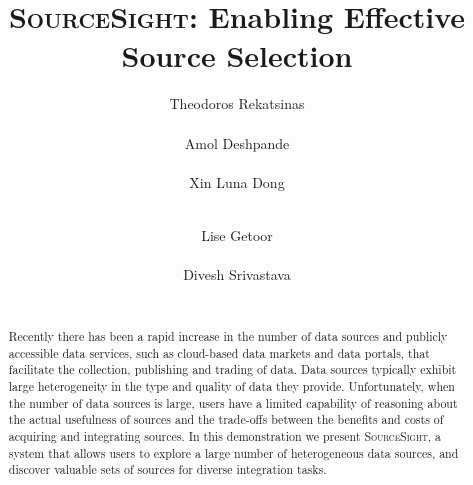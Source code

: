 \documentclass{vldb}
\newcommand\system{\textsc{SourceSight}}
\begin{document}

\title{{\LARGE \system}: Enabling Effective Source Selection}


\author{
\alignauthor
Theodoros Rekatsinas\\
       \\
\alignauthor
Amol Deshpande\\
       \\
\alignauthor 
Xin Luna Dong\\
       \\
\and  %
\alignauthor 
Lise Getoor\\
       \\
\alignauthor Divesh Srivastava\\
       \\
}

\maketitle

\begin{abstract}
Recently there has been a rapid increase in the number of data sources and publicly accessible data services, such as cloud-based data markets and data portals, that facilitate the collection, publishing and trading of data. Data sources typically exhibit large heterogeneity in the type and quality of data they provide. Unfortunately, when the number of data sources is large, users have a limited capability of reasoning about the actual usefulness of sources and the trade-offs between the benefits and costs of acquiring and integrating sources. In this demonstration we present \system, a system that allows users to explore a large number of heterogeneous data sources, and discover valuable sets of sources for diverse integration tasks.
\end{abstract}
\end{document}

